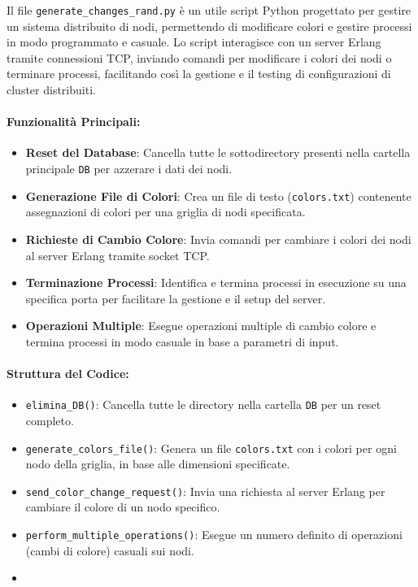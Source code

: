 \documentclass[12pt, a4paper]{report}
\begin{document}
Il file \texttt{generate\_changes\_rand.py} è un utile script Python progettato per gestire un sistema distribuito di nodi, permettendo di modificare colori e gestire processi in modo programmato e casuale. Lo script interagisce con un server Erlang tramite connessioni TCP, inviando comandi per modificare i colori dei nodi o terminare processi, facilitando così la gestione e il testing di configurazioni di cluster distribuiti.

\paragraph{Funzionalità Principali:}
\begin{itemize}
    \item \textbf{Reset del Database}: Cancella tutte le sottodirectory presenti nella cartella principale \texttt{DB} per azzerare i dati dei nodi.
    \item \textbf{Generazione File di Colori}: Crea un file di testo (\texttt{colors.txt}) contenente assegnazioni di colori per una griglia di nodi specificata.
    \item \textbf{Richieste di Cambio Colore}: Invia comandi per cambiare i colori dei nodi al server Erlang tramite socket TCP.
    \item \textbf{Terminazione Processi}: Identifica e termina processi in esecuzione su una specifica porta per facilitare la gestione e il setup del server.
    \item \textbf{Operazioni Multiple}: Esegue operazioni multiple di cambio colore e termina processi in modo casuale in base a parametri di input.
\end{itemize}

\paragraph{Struttura del Codice:}
\begin{itemize}
    \item \texttt{elimina\_DB()}: Cancella tutte le directory nella cartella \texttt{DB} per un reset completo.
    \item \texttt{generate\_colors\_file()}: Genera un file \texttt{colors.txt} con i colori per ogni nodo della griglia, in base alle dimensioni specificate.
    \item \texttt{send\_color\_change\_request()}: Invia una richiesta al server Erlang per cambiare il colore di un nodo specifico.
    \item \texttt{perform\_multiple\_operations()}: Esegue un numero definito di operazioni (cambi di colore) casuali sui nodi.
    \item 
\end{itemize}
\end{document}
